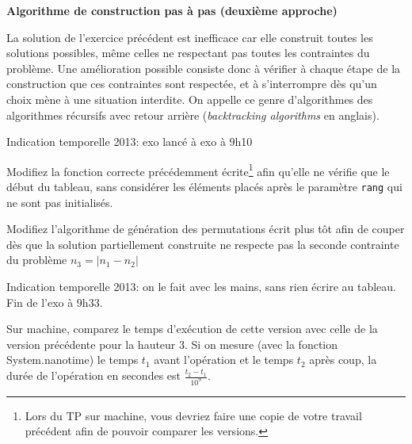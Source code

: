 \documentclass[10pt]{article}\usepackage[nu]{esial}
\begin{document}
\begin{Exercice}\textbf{Algorithme de construction pas à pas (deuxième approche)}

  \noindent La solution de l'exercice précédent est inefficace car elle
  construit toutes les solutions possibles, même celles ne respectant pas toutes
  les contraintes du problème. Une amélioration possible consiste donc à
  vérifier à chaque étape de la construction que ces contraintes sont respectée,
  et à s'interrompre dès qu'un choix mène à une situation interdite.
  On appelle ce genre d'algorithmes des algorithmes récursifs avec retour
  arrière (\textit{backtracking algorithms} en anglais).

  \begin{Reponse}
      Indication temporelle 2013: exo lancé à exo à 9h10
  \end{Reponse}

  \begin{Question}
    Modifiez la fonction correcte précédemment écrite\footnote{Lors du TP sur
      machine, vous devriez faire une copie de votre travail précédent afin de
      pouvoir comparer les versions.} afin qu'elle ne vérifie
    que le début du tableau, sans considérer les éléments placés après le
    paramètre \texttt{rang} qui ne sont pas initialisés.
  \end{Question}

  \begin{Reponse}
    \newcommand*\FancyVerbStartString{// BEGIN CORRECTE}
    \newcommand*\FancyVerbStopString{// END CORRECTE}
  \end{Reponse}

  \Question %
  Modifiez l'algorithme de génération des permutations écrit plus tôt afin de
  couper dès que la solution partiellement construite ne respecte pas la seconde
  contrainte du problème $n_3=\left|n_1-n_2\right|$

  \begin{Reponse}
    \newcommand*\FancyVerbStartString{// BEGIN GENERE}
    \newcommand*\FancyVerbStopString{// END GENERE}

    Indication temporelle 2013: on le fait avec les mains, sans rien écrire au
    tableau. Fin de l'exo à 9h33.
  \end{Reponse}

  \Question %
  Sur machine, comparez le temps d'exécution de cette version avec celle de la
  version précédente pour la hauteur 3.  Si on mesure (avec la fonction
  System.nanotime) le temps $t_1$ avant l'opération et le temps $t_2$ après
  coup, la durée de l'opération en secondes est $\frac{t_2-t_1}{10^9}$.
\end{Exercice}
\end{document}
